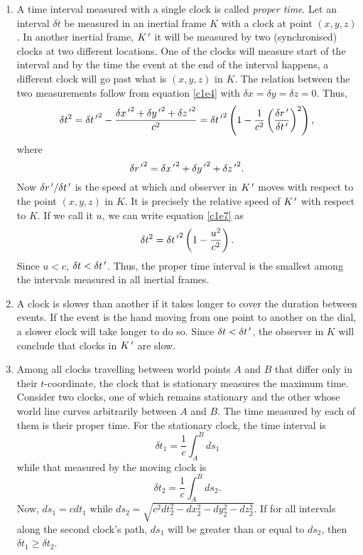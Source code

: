 \begin{enumerate}
\item A time interval measured with a single clock is called
\emph{proper time}. Let an interval $\delta t$ be measured in an inertial frame
$K$ with a clock at point $(x, y, z)$. In another inertial frame, $K^{\,\prime}$ it will
be measured by two (synchronised) clocks at two different locations. One of the
clocks will measure start of the interval and by the time the event at the end 
of the interval happens, a different clock will go past what is $(x, y, z)$ in
$K$. The relation between the two measurements follow from equation \eqref{c1e4}
with $\delta x = \delta y = \delta z = 0$. Thus,
\begin{equation}\label{c1e7}
\delta t^2 = \delta {t^{\,\prime}}^2 - \frac{\delta {x^{\,\prime}}^2 + \delta {y^{\,\prime}}^2 + \delta {z^{\,\prime}}^2}{c^2}
= \delta {t^{\,\prime}}^2\left(1 - \frac{1}{c^2}\left(\frac{\delta r^{\,\prime}}{\delta t^{\,\prime}}\right)^2\right),
\end{equation}
where
\begin{equation}\label{c1e8}
\delta {r^{\,\prime}}^2 = \delta {x^{\,\prime}}^2 + \delta {y^{\,\prime}}^2 + \delta {z^{\,\prime}}^2.
\end{equation}
Now $\delta r^{\,\prime}/\delta t^{\,\prime}$ is the speed at which and observer in $K^{\,\prime}$
moves with respect to the point $(x, y, z)$ in $K$. It is precisely the relative
speed of $K^{\,\prime}$ with respect to $K$. If we call it $u$, we can write equation
\eqref{c1e7} as
\begin{equation}\label{c1e9}
\delta t^2 = \delta {t^{\,\prime}}^2\left(1 - \frac{u^2}{c^2}\right).
\end{equation}
Since $u < c$, $\delta t < \delta t^{\,\prime}$. Thus, the proper time interval is the
smallest among the intervals measured in all inertial frames.

\item A clock is slower than another if it takes longer to cover the duration
between events. If the event is the hand moving from one point to another on
the dial, a slower clock will take longer to do so. Since $\delta t < \delta
t^{\,\prime}$, the observer in $K$ will conclude that clocks in $K^{\,\prime}$ are slow.

\item Among all clocks travelling between world points $A$ and $B$ that differ 
only in their $t$-coordinate, the clock that is stationary measures the maximum
time. Consider two clocks, one of which remains stationary and the other whose
world line curves arbitrarily between $A$ and $B$. The time measured by each of
them is their proper time. For the stationary clock, the time interval is
\begin{equation}\label{c1e10}
\delta t_1 = \frac{1}{c}\int_A^B ds_1
\end{equation}
while that measured by the moving clock is
\begin{equation}\label{c1e11}
\delta t_2 = \frac{1}{c}\int_A^B ds_2.
\end{equation}
Now, $ds_1 = cdt_1$ while $ds_2 = \sqrt{c^2dt_2^2 - dx_2^2 - dy_2^2 - dz_2^2}$.
If for all intervals along the second clock's path, $ds_1$ will be greater
than or equal to $ds_2$, then $\delta t_1 \ge \delta t_2$.


\end{enumerate}
